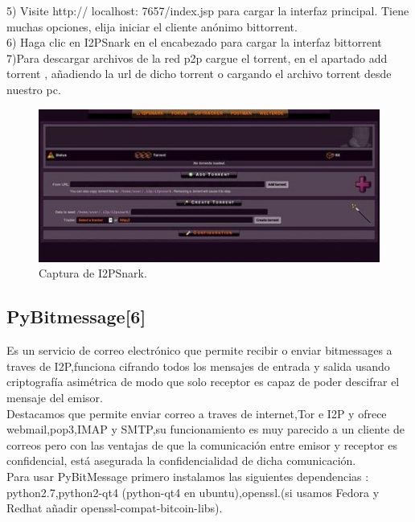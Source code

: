 \documentclass[12]{article}
\begin{document}
5) Visite http:// localhost: 7657/index.jsp para cargar la interfaz principal. Tiene muchas opciones, elija iniciar el cliente anónimo bittorrent.
\\

6) Haga clic en I2PSnark en el encabezado para cargar la interfaz bittorrent
\\

7)Para descargar archivos de la red p2p  cargue el torrent, en el apartado add torrent , añadiendo la url de dicho torrent o cargando el archivo torrent desde nuestro pc.
\\

\begin{figure}[H]
    \centering
    \includegraphics[width=1\textwidth]{media/i2p_3.jpg}
    \caption{Captura de I2PSnark.}
    \label{fig4}
\end{figure}


\subsection{PyBitmessage[6]}
Es un servicio de correo electrónico que permite recibir o enviar bitmessages a traves de I2P,funciona cifrando todos los mensajes de entrada y salida
usando criptografía asimétrica de modo que solo receptor es capaz de poder descifrar el mensaje del emisor.
\\

Destacamos que permite enviar correo a traves de internet,Tor e I2P y ofrece webmail,pop3,IMAP y SMTP,su funcionamiento es muy parecido a un cliente de correos
pero con las ventajas de que la comunicación entre  emisor y receptor es confidencial, está asegurada la confidencialidad de dicha comunicación.  
\\

Para usar PyBitMessage  primero instalamos las siguientes dependencias : python2.7,python2-qt4 (python-qt4 en ubuntu),openssl.(si usamos  Fedora y Redhat añadir openssl-compat-bitcoin-libs).
\\
\end{document}
